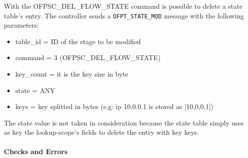 With the OFPSC\_DEL\_FLOW\_STATE command is possible to delete a state table's entry.
The controller sends a \texttt{OFPT\_STATE\_MOD} message with the following parameters:

\begin{itemize}
\item table\_id = ID of the stage to be modified
\item command = 3 (OFPSC\_DEL\_FLOW\_STATE)
\item key\_count = it is the key size in byte
\item state = ANY
\item keys = key splitted in bytes (e.g: ip 10.0.0.1 is stored as [10,0,0,1])
\end{itemize}


The state value is not taken in consideration because the state table simply uses as key the lookup-scope's fields to delete the entry with key keys.

\paragraph{Checks and Errors}

